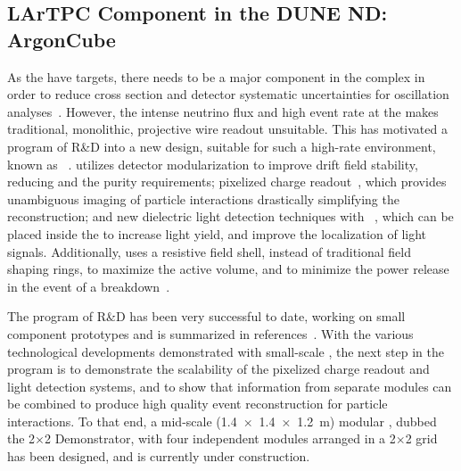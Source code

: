 \subsection{LArTPC Component in the DUNE ND: ArgonCube}
\label{sec:exsum-nd-lartpc}


As the   have  targets, there needs to be a major  component in the    complex in order to reduce cross section and detector systematic uncertainties for oscillation analyses~\cite{Acciarri:2016crz, Acciarri:2015uup}. However, the intense neutrino flux and high event rate at the   makes traditional, monolithic, projective wire readout  unsuitable.  This has motivated a program of R\&D into a new  design, suitable for such a high-rate environment, known as ~\cite{argoncube_loi}.  utilizes detector modularization to improve drift field stability, reducing  and the  purity requirements; pixelized charge readout~\cite{Asaadi:2018oxk, larpix}, which provides unambiguous \threed imaging of particle interactions drastically simplifying the reconstruction; and new dielectric light detection techniques with ~\cite{Auger:2017flc}, which can be placed inside the  to increase light yield, and improve the localization of light signals. Additionally,  uses a resistive field shell, instead of traditional field shaping rings, to maximize the active volume, and to minimize the power release in the event of a breakdown~\cite{argoncube_fd}. %

The program of  R\&D has been very successful to date, working on small component prototypes and is summarized in references~\cite{ Ereditato:2013xaa, Zeller:2013sva, art_cold_ero, Asaadi:2018oxk, Cavanna:2014iqa, larpix, argoncube_fd, Auger:2017flc}. 
With the various technological developments demonstrated with small-scale , the next step in the  program is to demonstrate the scalability of the pixelized charge readout and light detection systems, and to show that information from separate modules can be combined to produce high quality event reconstruction for particle interactions. To that end, a mid-scale (\SI[product-units=repeat]{1.4x1.4x1.2}{\metre}) modular , dubbed the  2$\times$2 Demonstrator, with four independent  modules arranged in a 2$\times$2 grid has been designed, and is currently under construction. 

